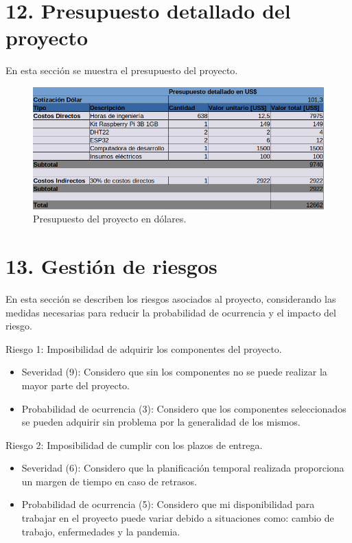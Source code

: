 \documentclass[
11pt, %
]{charter}
\begin{document}
\section{12. Presupuesto detallado del proyecto}
\label{sec:presupuesto}
En esta sección se muestra el presupuesto del proyecto.

\begin{figure}[htpb]
\centering 
\includegraphics[width=1.0\textwidth]{./Figuras/presupuesto.png}
\caption{Presupuesto del proyecto en dólares.}
\label{fig:presupuesto}
\end{figure}

\section{13. Gestión de riesgos}
\label{sec:riesgos}
En esta sección se describen los riesgos asociados al proyecto, considerando las medidas necesarias para reducir la probabilidad de ocurrencia y el impacto del riesgo.

Riesgo 1: Imposibilidad de adquirir los componentes del proyecto.
\begin{itemize}
	\item Severidad (9): Considero que sin los componentes no se puede realizar la mayor parte del proyecto.
	\item Probabilidad de ocurrencia (3): Considero que los componentes seleccionados se pueden adquirir sin problema por la generalidad de los mismos.
\end{itemize}


Riesgo 2: Imposibilidad de cumplir con los plazos de entrega.
\begin{itemize}
	\item Severidad (6):
	Considero que la planificación temporal realizada proporciona un margen de tiempo en caso de retrasos.
	\item Probabilidad de ocurrencia (5): 
	Considero que mi disponibilidad para trabajar en el proyecto puede variar debido a situaciones como: cambio de trabajo, enfermedades y la pandemia. 
\end{itemize}
\end{document}
